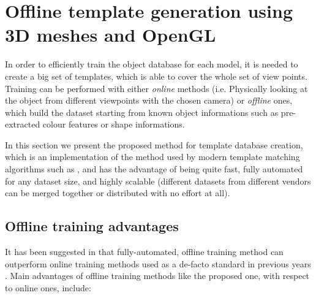 \section{Offline template generation using 3D meshes and OpenGL} \label{sec:training}
In order to efficiently train the object database for each model, it is needed
to create a big set of templates, which is able to cover the whole set of view
points. Training can be performed with either \emph{online} methods (i.e.
Physically looking at the object from different viewpoints with the chosen
camera) or \emph{offline} ones, which build the dataset starting from known
object informations such as pre-extracted colour features or shape informations.

In this section we present the proposed method for template database
creation, which is an implementation of the method used by modern template
matching algorithms such as \cite{linemod-paper}, and
has the advantage of being quite fast, fully automated for any dataset size,
and highly scalable (different datasets from different vendors can be merged
together or distributed with no effort at all).

\subsection{Offline training advantages}
It has been suggested in \cite{TODO} that fully-automated, offline training method can
outperform online training methods used as a de-facto standard
in previous years \cite{TODO}. Main advantages of offline training methods like
the proposed one, with respect
to online ones, include:

